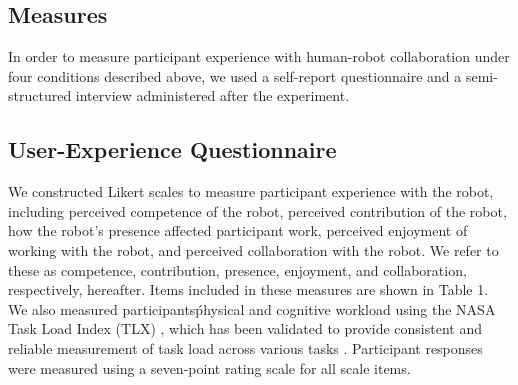 \subsection{Measures}
       In order to measure participant experience with human-robot collaboration under four conditions described above, we used a self-report questionnaire and a semi-structured interview administered after the experiment.
\subsection{User-Experience Questionnaire}
       We constructed Likert scales to measure participant experience with the robot, including perceived competence of the robot, perceived contribution of the robot, how the robot's presence affected participant work, perceived enjoyment of working with the robot, and perceived collaboration with the robot. We refer to these as competence, contribution, presence, enjoyment, and collaboration, respectively, hereafter. Items included in these measures are shown in Table 1. We also measured participants\' physical and cognitive workload using the NASA Task Load Index (TLX) \cite{hart1988development}, which has been validated to provide consistent and reliable measurement of task load across various tasks \cite{hart2006nasa}. Participant responses were measured using a seven-point rating scale for all scale items.
 

